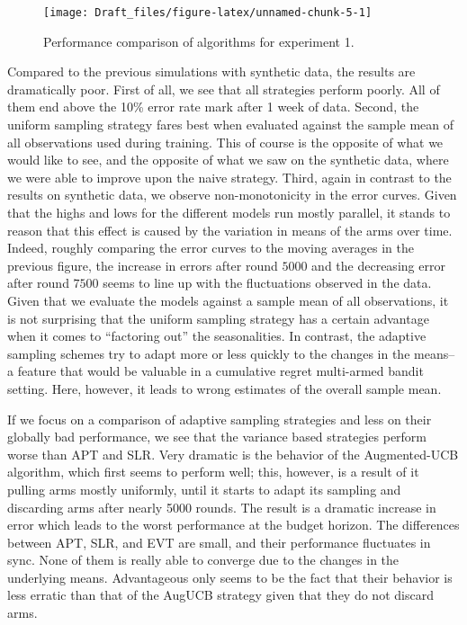 \documentclass[11pt,]{article}
\begin{document}
\begin{figure}

{\centering \texttt{[image: Draft\_files/figure-latex/unnamed-chunk-5-1]} 

}

\caption{Performance comparison of algorithms for experiment 1.}\label{fig:unnamed-chunk-5}
\end{figure}

Compared to the previous simulations with synthetic data, the results
are dramatically poor. First of all, we see that all strategies perform
poorly. All of them end above the 10\% error rate mark after 1 week of
data. Second, the uniform sampling strategy fares best when evaluated
against the sample mean of all observations used during training. This
of course is the opposite of what we would like to see, and the opposite
of what we saw on the synthetic data, where we were able to improve upon
the naive strategy. Third, again in contrast to the results on synthetic
data, we observe non-monotonicity in the error curves. Given that the
highs and lows for the different models run mostly parallel, it stands
to reason that this effect is caused by the variation in means of the
arms over time. Indeed, roughly comparing the error curves to the moving
averages in the previous figure, the increase in errors after round
\(5000\) and the decreasing error after round \(7500\) seems to line up
with the fluctuations observed in the data. Given that we evaluate the
models against a sample mean of all observations, it is not surprising
that the uniform sampling strategy has a certain advantage when it comes
to ``factoring out'' the seasonalities. In contrast, the adaptive
sampling schemes try to adapt more or less quickly to the changes in the
means--a feature that would be valuable in a cumulative regret
multi-armed bandit setting. Here, however, it leads to wrong estimates
of the overall sample mean.

If we focus on a comparison of adaptive sampling strategies and less on
their globally bad performance, we see that the variance based
strategies perform worse than APT and SLR. Very dramatic is the behavior
of the Augmented-UCB algorithm, which first seems to perform well; this,
however, is a result of it pulling arms mostly uniformly, until it
starts to adapt its sampling and discarding arms after nearly 5000
rounds. The result is a dramatic increase in error which leads to the
worst performance at the budget horizon. The differences between APT,
SLR, and EVT are small, and their performance fluctuates in sync. None
of them is really able to converge due to the changes in the underlying
means. Advantageous only seems to be the fact that their behavior is
less erratic than that of the AugUCB strategy given that they do not
discard arms.
\end{document}
